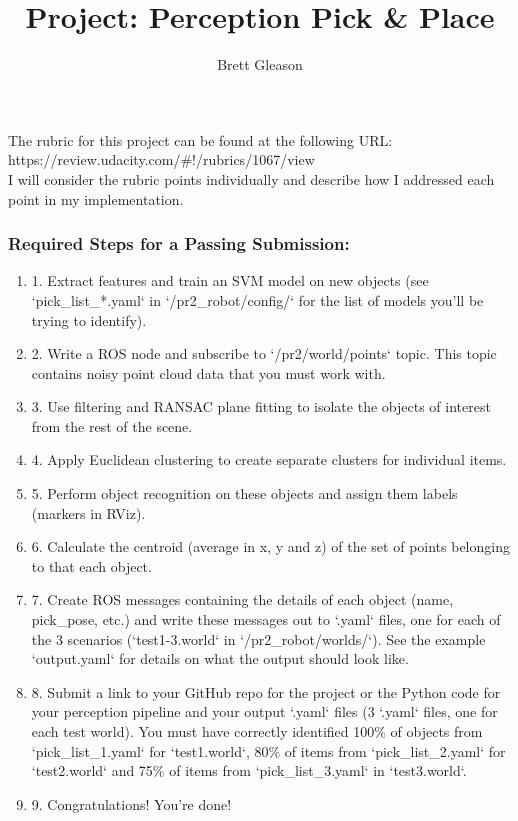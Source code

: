 \documentclass{article}
\begin{document}
\title{Project: Perception Pick \& Place}
\author{Brett Gleason}

\maketitle

The rubric for this project can be found at the following URL: \\
https://review.udacity.com/\#!/rubrics/1067/view \\
I will consider the rubric points individually and describe how I addressed each point in my implementation.

\subsubsection{Required Steps for a Passing Submission:}

\begin{enumerate}
    \item 1. Extract features and train an SVM model on new objects (see `pick\_list\_*.yaml` in `/pr2\_robot/config/` for the list of models you'll be trying to identify). 
    \item 2. Write a ROS node and subscribe to `/pr2/world/points` topic. This topic contains noisy point cloud data that you must work with.
    \item 3. Use filtering and RANSAC plane fitting to isolate the objects of interest from the rest of the scene.
    \item 4. Apply Euclidean clustering to create separate clusters for individual items.
    \item 5. Perform object recognition on these objects and assign them labels (markers in RViz).
    \item 6. Calculate the centroid (average in x, y and z) of the set of points belonging to that each object.
    \item 7. Create ROS messages containing the details of each object (name, pick\_pose, etc.) and write these messages out to `.yaml` files, one for each of the 3 scenarios (`test1-3.world` in `/pr2\_robot/worlds/`).  See the example `output.yaml` for details on what the output should look like.  
    \item 8. Submit a link to your GitHub repo for the project or the Python code for your perception pipeline and your output `.yaml` files (3 `.yaml` files, one for each test world).  You must have correctly identified 100\% of objects from `pick\_list\_1.yaml` for `test1.world`, 80\% of items from `pick\_list\_2.yaml` for `test2.world` and 75\% of items from `pick\_list\_3.yaml` in `test3.world`.
    \item 9. Congratulations!  You're done!
\end{enumerate}
\end{document}
